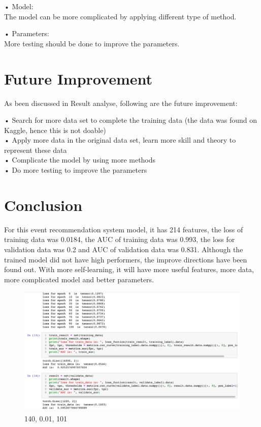 \documentclass{article}
\begin{document}
•	Model:\\
	The model can be more complicated by applying different type of method.
	
•	Parameters:\\
	More testing should be done to improve the parameters.\\

\section{Future Improvement}

As been discussed in Result analyse, following are the future improvement:

•	Search for more data set to complete the training data (the data was found on Kaggle, hence this is not doable)\\
•	Apply more data in the original data set, learn more skill and theory to represent these data\\
•	Complicate the model by using more methods\\
•	Do more testing to improve the parameters\\

\section{Conclusion}

For this event recommendation system model, it has 214 features, the loss of training data was 0.0184, the AUC of training data was 0.993, the loss for validation data was 0.2 and AUC of validation data was 0.831. Although the trained model did not have high performers, the improve directions have been found out. With more self-learning, it will have more useful features, more data, more complicated model and better parameters. 

\begin{figure}[h]
  \centering
  \includegraphics[width=1.0\textwidth]{img/Picture 10}
  \caption{140, 0.01, 101}
\end{figure}
\end{document}
